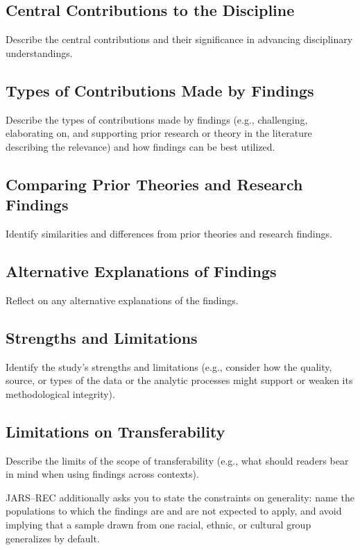 \documentclass[acmsmall,screen,anonymous,review]{acmart}
\begin{document}
\subsection{Central Contributions to the Discipline}

Describe the central contributions and their significance in advancing disciplinary understandings.

\subsection{Types of Contributions Made by Findings}
Describe the types of contributions made by findings (e.g., challenging, elaborating on,
and supporting prior research or theory in the literature describing the relevance) and how
findings can be best utilized.

\subsection{Comparing Prior Theories and Research Findings}
Identify similarities and differences from prior theories and research findings.

\subsection{Alternative Explanations of Findings}
Reflect on any alternative explanations of the findings.

\subsection{Strengths and Limitations}
Identify the study’s strengths and limitations (e.g., consider how the quality, source, or types
of the data or the analytic processes might support or weaken its methodological integrity).

\subsection{Limitations on Transferability}
Describe the limits of the scope of transferability (e.g., what should readers bear in mind
when using findings across contexts).


JARS--REC additionally asks you to state the constraints on generality: name the populations to which the findings are and are not expected to apply, and avoid implying that a sample drawn from one racial, ethnic, or cultural group generalizes by default.
\end{document}
